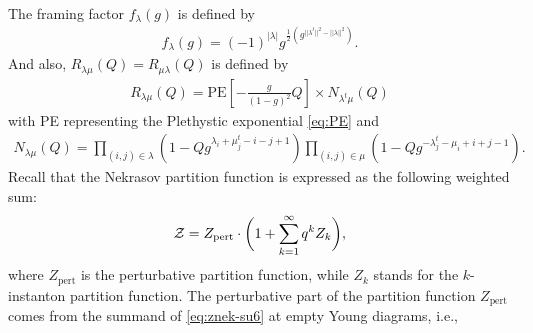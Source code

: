 \documentclass[letterpaper, 11pt]{article}
\def\CZ{{\cal Z}}
\begin{document}
{\begin{align}
\end{align}
The framing factor $f_{\lambda}(g)$ is defined by
\begin{align}
f_\lambda(g) = (-1)^{|\lambda|}g^{\frac{1}{2}(g^{||\lambda^t||^2 - ||\lambda||^2})}.
\end{align}
And also, $R_{\lambda \mu } (Q)=R_{\mu \lambda} (Q)$ is defined by
\begin{align}
R_{\lambda \mu } (Q)%
=\text{PE} \left[ - \frac{g}{(1-g)^2} Q \right]
\times N_{\lambda^t \mu} (Q)
\end{align}
with PE representing the Plethystic exponential \eqref{eq:PE}
 and 
\begin{align}
N_{\lambda \mu} (Q) 
= \prod_{(i,j) \in \lambda} \left( 1 - Q g^{\lambda_i + \mu_j^t -i-j+1} \right)
\prod_{(i,j) \in \mu} \left( 1 - Q g^{-\lambda^t_j - \mu_i + i + j - 1} \right). 
\end{align}
Recall that the Nekrasov partition function is expressed as the following weighted sum: %
\begin{align}
\CZ = Z_{\text{pert}} \cdot \bigg(1 + \sum_{k=1}^{\infty}q^kZ_k\bigg) ,
\end{align}
where $Z_{\text{pert}}$ is the perturbative partition function, while $Z_k$ stands for the $k$-instanton partition function. 
The perturbative part of the partition function $Z_{\text{pert}}$ comes from the summand of \eqref{eq:znek-su6} at empty Young diagrams, i.e., %
}
\end{document}
